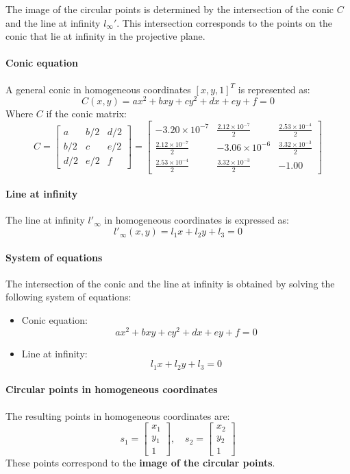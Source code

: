 The image of the circular points is determined by the intersection of the conic $C$ and the line at infinity $l_\infty'$. This intersection corresponds to the points on the conic that lie at infinity in the projective plane.

\paragraph{Conic equation} A general conic in homogeneous coordinates $[x, y, 1]^T$ is represented as:
$$C(x,y) = ax^2 + bxy + cy^2 + dx + ey + f = 0$$
Where $C$ if the conic matrix:
\[
    C
    =
    \begin{bmatrix}
        a & b/2 & d/2 \\
        b/2 & c & e/2 \\
        d/2 & e/2 & f
    \end{bmatrix}
    = 
     \begin{bmatrix}
        -3.20 \times 10^{-7} & \frac{2.12 \times 10^{-7}}{2} & \frac{2.53 \times 10^{-4}}{2} \\
        \frac{2.12 \times 10^{-7}}{2} & -3.06 \times 10^{-6} & \frac{3.32 \times 10^{-3}}{2} \\
        \frac{2.53 \times 10^{-4}}{2} & \frac{3.32 \times 10^{-3}}{2} & -1.00
    \end{bmatrix}
\]

\paragraph{Line at infinity} The line at infinity $l'_\infty$ in homogeneous coordinates is expressed as:
$$l'_\infty(x, y) = l_1x + l_2y + l_3 = 0$$

\paragraph{System of equations}
The intersection of the conic and the line at infinity is obtained by solving the following system of equations:
\begin{itemize}
    \item Conic equation:
    $$ax^2 + bxy + cy^2 + dx + ey + f = 0$$
    \item Line at infinity:
    $$l_1x + l_2y + l_3 = 0$$
\end{itemize}

\paragraph{Circular points in homogeneous coordinates} The resulting points in homogeneous coordinates are:
\[
    s_1 = \begin{bmatrix}
        x_1 \\
        y_1 \\
        1
    \end{bmatrix}, \quad
    s_2 = \begin{bmatrix}
        x_2 \\
        y_2 \\
        1
    \end{bmatrix}
\]
These points correspond to the \textbf{image of the circular points}.

